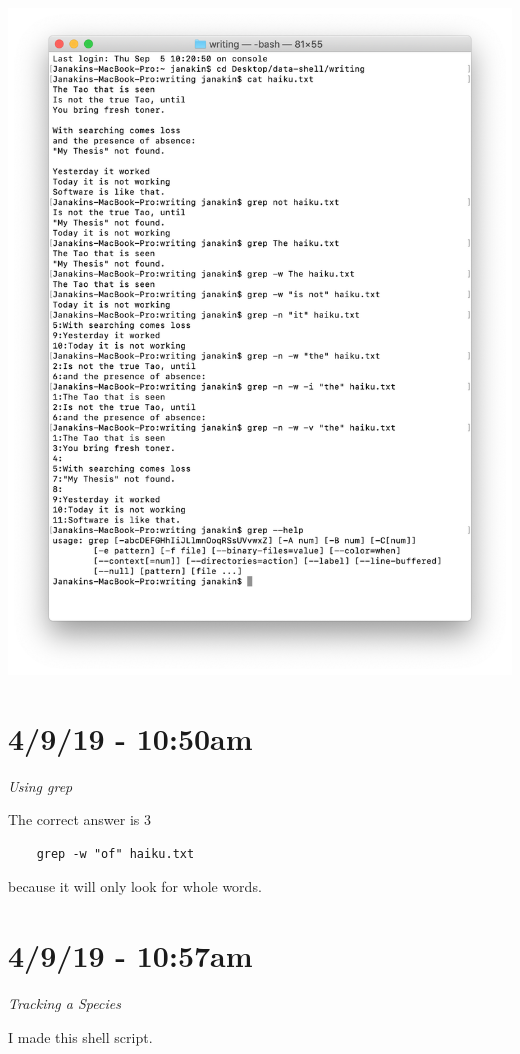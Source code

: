 \documentclass{article}
\begin{document}
\includegraphics[width=\textwidth]{fta.png}

\section*{4/9/19 - 10:50am}

\textit{Using grep}

The correct answer is 3 \begin{verbatim}
    grep -w "of" haiku.txt
\end{verbatim} because it will only look for whole words.

\section*{4/9/19 - 10:57am}

\textit{Tracking a Species}

I made this shell script.
\end{document}
